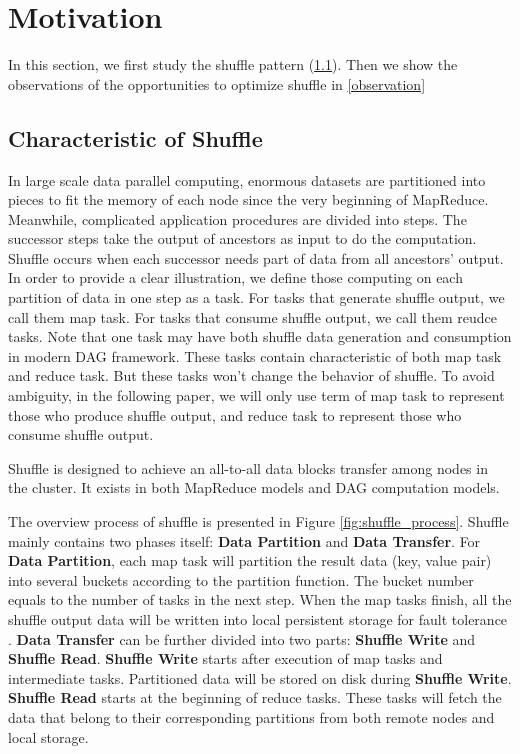 \section{Motivation}

In this section, we first study the shuffle pattern (\ref{shuffle pattern}). 
Then we show the observations of the opportunities to optimize shuffle in \ref{observation}
\subsection{Characteristic of Shuffle} \label{shuffle pattern}

In large scale data parallel computing, enormous datasets are partitioned into pieces to fit the memory of each node since the very beginning of MapReduce\cite{mapreduce}.
Meanwhile, complicated application procedures are divided into steps. The successor steps take the output of ancestors as input to do the computation. Shuffle occurs when each successor needs 
part of data from all ancestors' output. In order to provide a clear illustration, we define those computing on each partition of data in one step as a task. For tasks that generate shuffle output, we call
them map task. For tasks that consume shuffle output, we call them reudce tasks. Note that one task may have both shuffle data generation and consumption in modern DAG framework. These tasks contain characteristic of both map task and reduce task. But these tasks won't change the behavior of shuffle. To avoid ambiguity, in the following paper, we will only use term of map task to represent those who produce shuffle output, and reduce task to represent those who consume shuffle output.

Shuffle is designed to achieve an all-to-all data blocks transfer among nodes in the cluster. It exists in both MapReduce models and DAG computation models.

The overview process of shuffle is presented in Figure \ref{fig:shuffle_process}. Shuffle mainly contains two phases itself: \textbf{Data Partition} and \textbf{Data Transfer}. For \textbf{Data Partition}, each map task will partition the result data (key, value pair) into several buckets according to the partition function.
The bucket number equals to the number of tasks in the next step. When the map tasks finish, all the shuffle output data will be written into local persistent storage for fault tolerance \cite{mapreduce, spark}.
\textbf{Data Transfer} can be further divided into two parts: \textbf{Shuffle Write} and \textbf{Shuffle Read}. \textbf{Shuffle Write} starts after execution of map tasks and intermediate tasks. Partitioned data will  be stored on disk during \textbf{Shuffle Write}. \textbf{Shuffle Read} starts at the beginning of reduce tasks. These tasks will fetch the data that belong to their corresponding partitions from both remote nodes and local storage.

